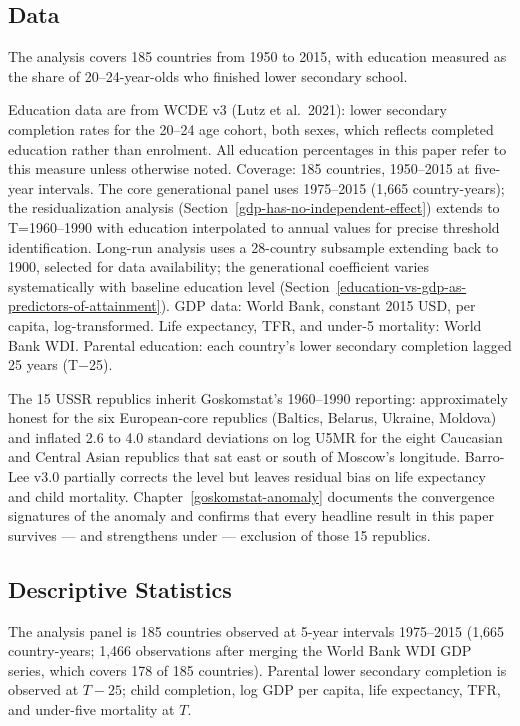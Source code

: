 \documentclass[12pt,letterpaper]{article}
\begin{document}
\subsection{Data}\label{data}

The analysis covers 185 countries from 1950 to 2015, with education measured as the share of 20--24-year-olds who finished lower secondary school.

Education data are from WCDE v3 (Lutz et al.~2021): lower secondary
completion rates for the 20--24 age cohort, both sexes, which reflects
completed education rather than enrolment. All education percentages in
this paper refer to this measure unless otherwise noted. Coverage: 185
countries, 1950--2015 at five-year intervals.
The core generational
panel uses 1975--2015 (1,665 country-years); the residualization
analysis (Section~\ref{gdp-has-no-independent-effect}) extends to T=1960--1990 with education
interpolated to annual values for precise threshold identification.
Long-run analysis uses a 28-country subsample extending back to 1900,
selected for data availability; the generational coefficient varies
systematically with baseline education level (Section~\ref{education-vs-gdp-as-predictors-of-attainment}). GDP data:
World Bank, constant 2015 USD, per capita, log-transformed. Life
expectancy, TFR, and under-5 mortality: World Bank WDI. Parental
education: each country's lower secondary completion lagged 25 years
(T−25).

The 15 USSR republics inherit Goskomstat's 1960--1990 reporting:
approximately honest for the six European-core republics (Baltics,
Belarus, Ukraine, Moldova) and inflated 2.6 to 4.0 standard deviations
on log U5MR for the eight Caucasian and Central Asian republics that
sat east or south of Moscow's longitude. Barro-Lee v3.0 partially
corrects the level but leaves residual bias on life expectancy and
child mortality. Chapter~\ref{goskomstat-anomaly} documents the
convergence signatures of the anomaly and confirms that every headline
result in this paper survives --- and strengthens under --- exclusion
of those 15 republics.

\subsection{Descriptive Statistics}\label{descriptive-statistics}

The analysis panel is 185 countries observed at 5-year intervals
1975--2015 (1{,}665 country-years; 1{,}466 observations after merging
the World Bank WDI GDP series, which covers 178 of 185 countries).
Parental lower secondary completion is observed at $T{-}25$; child
completion, log GDP per capita, life expectancy, TFR, and under-five
mortality at $T$.
\end{document}
